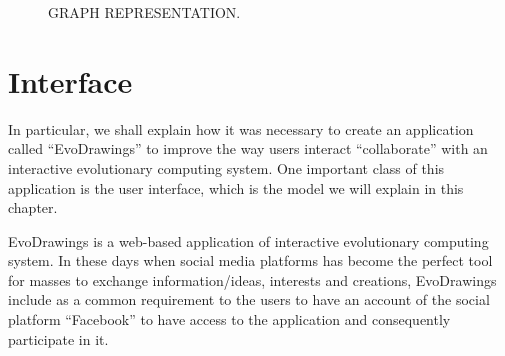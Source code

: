 \begin{figure}
\captionsetup{justification=centering,margin=2cm}
\centering
\setlength\fboxsep{0pt}
\setlength\fboxrule{0.7pt}
\caption{GRAPH REPRESENTATION.}
\label{fig:graph}       
\end{figure}


\section{Interface}
In particular, we shall explain how it was necessary to create an application called “EvoDrawings” to improve the way users interact “collaborate” with an interactive evolutionary computing system. One important class of this application is the user interface, which is the model we will explain in this chapter.

EvoDrawings is a web-based application of interactive evolutionary computing system. In these days when social media platforms has become the perfect tool for masses to exchange information/ideas, interests and creations, EvoDrawings include as a common requirement to the users to have an account of the social platform “Facebook” to have access to the application and consequently participate in it.

